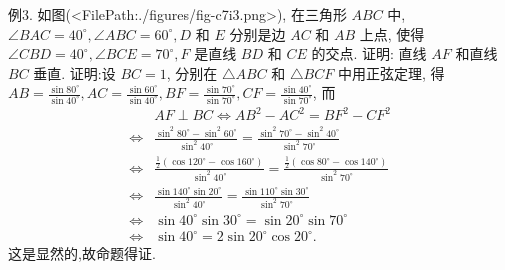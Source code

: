 例3. 如图(<FilePath:./figures/fig-c7i3.png>), 在三角形 $A B C$ 中, $\angle B A C=40^{\circ}, \angle A B C=60^{\circ}, D$ 和 $E$ 分别是边 $A C$ 和 $A B$ 上点, 使得 $\angle C B D=40^{\circ}, \angle B C E=70^{\circ}, F$ 是直线 $B D$ 和 $C E$ 的交点.
证明: 直线 $A F$ 和直线 $B C$ 垂直.
证明:设 $B C=1$, 分别在 $\triangle A B C$ 和 $\triangle B C F$ 中用正弦定理, 得
$A B=\frac{\sin 80^{\circ}}{\sin 40^{\circ}}, A C=\frac{\sin 60^{\circ}}{\sin 40^{\circ}}, B F=\frac{\sin 70^{\circ}}{\sin 70^{\circ}}, C F=\frac{\sin 40^{\circ}}{\sin 70^{\circ}}$,
而
$$
\begin{aligned}
& A F \perp B C \Leftrightarrow A B^2-A C^2=B F^2-C F^2 \\
\Leftrightarrow & \frac{\sin ^2 80^{\circ}-\sin ^2 60^{\circ}}{\sin ^2 40^{\circ}}=\frac{\sin ^2 70^{\circ}-\sin ^2 40^{\circ}}{\sin ^2 70^{\circ}} \\
\Leftrightarrow & \frac{\frac{1}{2}\left(\cos 120^{\circ}-\cos 160^{\circ}\right)}{\sin ^2 40^{\circ}}=\frac{\frac{1}{2}\left(\cos 80^{\circ}-\cos 140^{\circ}\right)}{\sin ^2 70^{\circ}} \\
\Leftrightarrow & \frac{\sin 140^{\circ} \sin 20^{\circ}}{\sin ^2 40^{\circ}}=\frac{\sin 110^{\circ} \sin 30^{\circ}}{\sin ^2 70^{\circ}} \\
\Leftrightarrow & \sin 40^{\circ} \sin 30^{\circ}=\sin 20^{\circ} \sin 70^{\circ} \\
\Leftrightarrow & \sin 40^{\circ}=2 \sin 20^{\circ} \cos 20^{\circ} .
\end{aligned}
$$
这是显然的,故命题得证.



